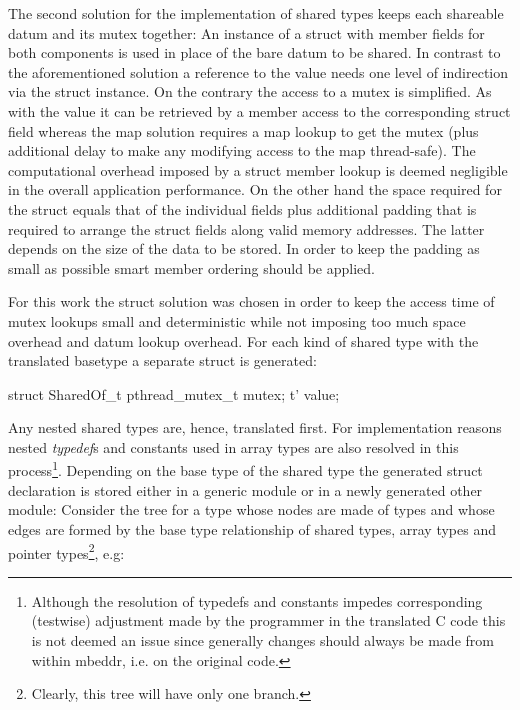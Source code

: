The second solution for the implementation of shared types keeps each shareable datum and its mutex together: An instance of a struct with member fields for both components is used in place of the bare datum to be shared. In contrast to the aforementioned solution a reference to the value  needs one level of indirection via the struct instance. On the contrary the access to a mutex is simplified. As with the value it can be retrieved by a member access to the corresponding struct field whereas the map solution requires a map lookup to get the mutex (plus additional delay to make any modifying access to the map thread-safe). The computational overhead imposed by a struct member lookup is deemed negligible in the overall application performance. On the other hand the space required for the struct equals that of the individual fields plus additional padding\cite[pp.~303 ff.]{LinuxSystemProgramming} that is required to arrange the struct fields along valid memory addresses. The latter depends on the size of the data to be stored. In order to keep the padding as small as possible smart member ordering should be applied. 

For this work the struct solution was chosen in order to keep the access time of mutex lookups small and deterministic while not imposing too much space overhead and datum lookup overhead. For each kind of shared type  with the translated basetype  a separate struct is generated:
\begin{ccode}
struct SharedOf_t {
  pthread_mutex_t mutex;
  t' value;
}
\end{ccode}
Any nested shared types are, hence, translated first. For implementation reasons nested \textit{typedef}s and constants used in array types are also resolved in this process\footnote{Although the resolution of typedefs and constants impedes corresponding (testwise) adjustment made by the programmer in the translated C code this is not deemed an issue since generally changes should always be made from within mbeddr, i.e. on the original code.}. Depending on the base type of the shared type the generated struct declaration is stored either in a generic module or in a newly generated other module: Consider the tree for a type  whose nodes are made of types and whose edges are formed by the base type relationship of shared types, array types and pointer types\footnote{Clearly, this tree will have only one branch.}, e.g: 


